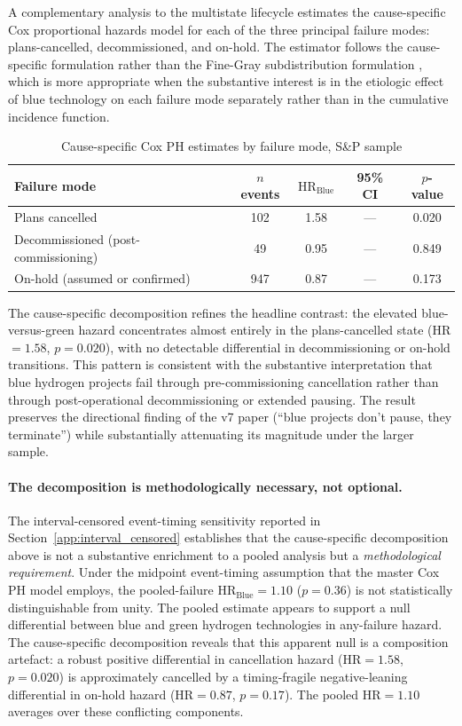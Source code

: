 A complementary analysis to the multistate lifecycle estimates the cause-specific Cox proportional hazards model \cite{cox1972regression} for each of the three principal failure modes: plans-cancelled, decommissioned, and on-hold. The estimator follows the cause-specific formulation rather than the Fine-Gray subdistribution formulation \cite{fine1999proportional}, which is more appropriate when the substantive interest is in the etiologic effect of blue technology on each failure mode separately rather than in the cumulative incidence function.

\begin{table}[!htbp]
\centering
\caption{Cause-specific Cox PH estimates by failure mode, S\&P sample}
\label{tab:app-competing-risks}
\begin{tabular}{lcccc}
\toprule
Failure mode & $n$ events & $\text{HR}_{\text{Blue}}$ & 95\% CI & $p$-value \\
\midrule
Plans cancelled & 102 & 1.58 & --- & 0.020 \\
Decommissioned (post-commissioning) & 49 & 0.95 & --- & 0.849 \\
On-hold (assumed or confirmed) & 947 & 0.87 & --- & 0.173 \\
\bottomrule
\end{tabular}
\end{table}

The cause-specific decomposition refines the headline contrast: the elevated blue-versus-green hazard concentrates almost entirely in the plans-cancelled state (HR $= 1.58$, $p = 0.020$), with no detectable differential in decommissioning or on-hold transitions. This pattern is consistent with the substantive interpretation that blue hydrogen projects fail through pre-commissioning cancellation rather than through post-operational decommissioning or extended pausing. The result preserves the directional finding of the v7 paper (``blue projects don't pause, they terminate'') while substantially attenuating its magnitude under the larger sample.

\paragraph{The decomposition is methodologically necessary, not optional.}
The interval-censored event-timing sensitivity reported in Section~\ref{app:interval_censored} establishes that the cause-specific decomposition above is not a substantive enrichment to a pooled analysis but a \emph{methodological requirement}. Under the midpoint event-timing assumption that the master Cox PH model employs, the pooled-failure $\text{HR}_{\text{Blue}} = 1.10$ ($p = 0.36$) is not statistically distinguishable from unity. The pooled estimate appears to support a null differential between blue and green hydrogen technologies in any-failure hazard. The cause-specific decomposition reveals that this apparent null is a composition artefact: a robust positive differential in cancellation hazard ($\text{HR} = 1.58$, $p = 0.020$) is approximately cancelled by a timing-fragile negative-leaning differential in on-hold hazard ($\text{HR} = 0.87$, $p = 0.17$). The pooled $\text{HR} = 1.10$ averages over these conflicting components.

